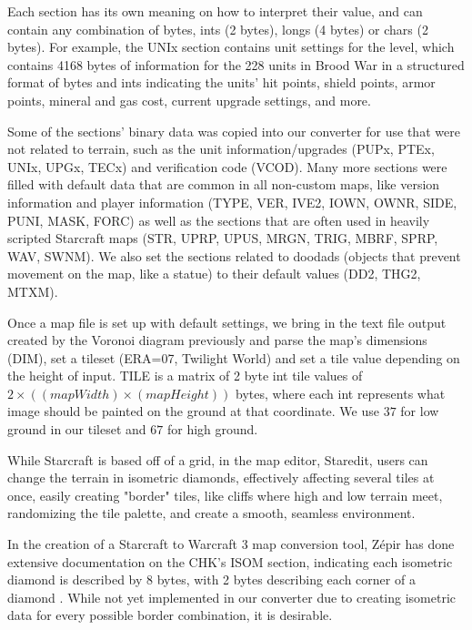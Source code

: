 \documentclass[letterpaper]{article}
\begin{document}
Each section has its own meaning on how to interpret their value, and can contain any combination of bytes, ints (2 bytes), longs (4 bytes) or chars (2 bytes). For example, the UNIx section contains unit settings for the level, which contains 4168 bytes of information for the 228 units in Brood War in a structured format of bytes and ints indicating the units' hit points, shield points, armor points, mineral and gas cost, current upgrade settings, and more.

Some of the sections' binary data was copied into our converter for use that were not related to terrain, such as the unit information/upgrades (PUPx, PTEx, UNIx, UPGx, TECx) and verification code (VCOD). Many more sections were filled with default data that are common in all non-custom maps, like version information and player information (TYPE, VER, IVE2, IOWN, OWNR, SIDE, PUNI, MASK, FORC) as well as the sections that are often used in heavily scripted Starcraft maps (STR, UPRP, UPUS, MRGN, TRIG, MBRF, SPRP, WAV, SWNM). We also set the sections related to doodads (objects that prevent movement on the map, like a statue) to their default values (DD2, THG2, MTXM).

Once a map file is set up with default settings, we bring in the text file output created by the Voronoi diagram previously and parse the map's dimensions (DIM), set a tileset (ERA=07, Twilight World) and set a tile value depending on the height of input. TILE is a matrix of 2 byte int tile values of $2 \times ((mapWidth)  \times (mapHeight))$ bytes, where each int represents what image should be painted on the ground at that coordinate. We use $37$ for low ground in our tileset and $67$ for high ground.

While Starcraft is based off of a grid, in the map editor, Staredit, users can change the terrain in isometric diamonds, effectively affecting several tiles at once, easily creating "border" tiles, like cliffs where high and low terrain meet, randomizing the tile palette, and create a smooth, seamless environment.

In the creation of a Starcraft to Warcraft 3 map conversion tool, Z\'{e}pir has done extensive documentation on the CHK's ISOM section, indicating each isometric diamond is described by 8 bytes, with 2 bytes describing each corner of a diamond \cite{Zepir}. While not yet implemented in our converter due to creating isometric data for every possible border combination, it is desirable.
\end{document}
